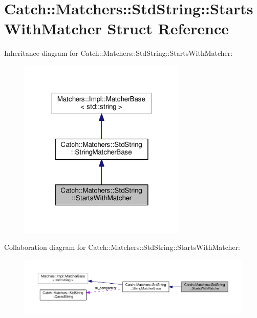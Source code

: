 \hypertarget{structCatch_1_1Matchers_1_1StdString_1_1StartsWithMatcher}{}\section{Catch\+:\+:Matchers\+:\+:Std\+String\+:\+:Starts\+With\+Matcher Struct Reference}
\label{structCatch_1_1Matchers_1_1StdString_1_1StartsWithMatcher}


Inheritance diagram for Catch\+:\+:Matchers\+:\+:Std\+String\+:\+:Starts\+With\+Matcher\+:\nopagebreak
\begin{figure}[H]
\begin{center}
\leavevmode
\includegraphics[width=226pt]{structCatch_1_1Matchers_1_1StdString_1_1StartsWithMatcher__inherit__graph}
\end{center}
\end{figure}


Collaboration diagram for Catch\+:\+:Matchers\+:\+:Std\+String\+:\+:Starts\+With\+Matcher\+:\nopagebreak
\begin{figure}[H]
\begin{center}
\leavevmode
\includegraphics[width=350pt]{structCatch_1_1Matchers_1_1StdString_1_1StartsWithMatcher__coll__graph}
\end{center}
\end{figure}
